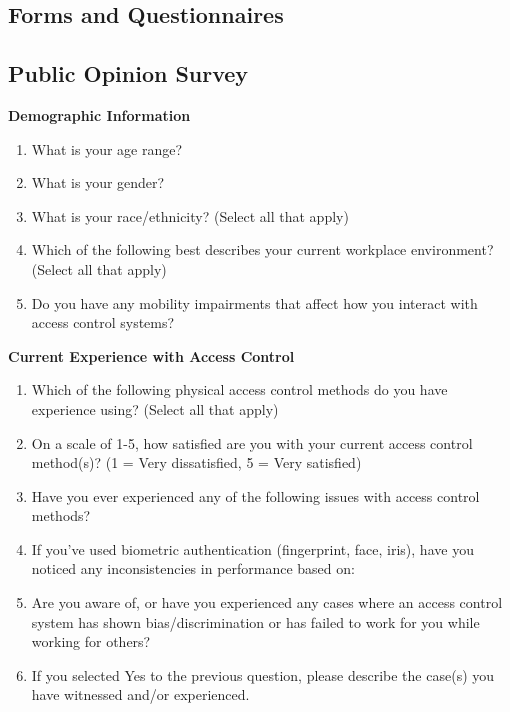 \begin{appendices}

    \chapter{Forms and Questionnaires}

    \section{Public Opinion Survey}
    \label{app:public-opinion-survey}

    \begin{center}
        \begin{tcolorbox}[breakable, colback=white, colframe=black, width=\textwidth, boxrule=0.5pt]
            \scriptsize

            \textbf{Demographic Information}
            \begin{enumerate}
                \item What is your age range?
                \item What is your gender?
                \item What is your race/ethnicity? (Select all that apply)
                \item Which of the following best describes your current workplace environment? (Select all that apply)
                \item Do you have any mobility impairments that affect how you interact with access control systems?
            \end{enumerate}

            \textbf{Current Experience with Access Control}
            \begin{enumerate}
                \item Which of the following physical access control methods do you have experience using? (Select all that apply)
                \item On a scale of 1-5, how satisfied are you with your current access control method(s)? (1 = Very dissatisfied, 5 = Very satisfied)
                \item Have you ever experienced any of the following issues with access control methods?
                \item If you've used biometric authentication (fingerprint, face, iris), have you noticed any inconsistencies in performance based on:
                \item Are you aware of, or have you experienced any cases where an access control system has shown bias/discrimination or has failed to work for you while working for others?
                \item If you selected Yes to the previous question, please describe the case(s) you have witnessed and/or experienced.
            \end{enumerate}


\end{tcolorbox}
\end{center}
\end{appendices}
